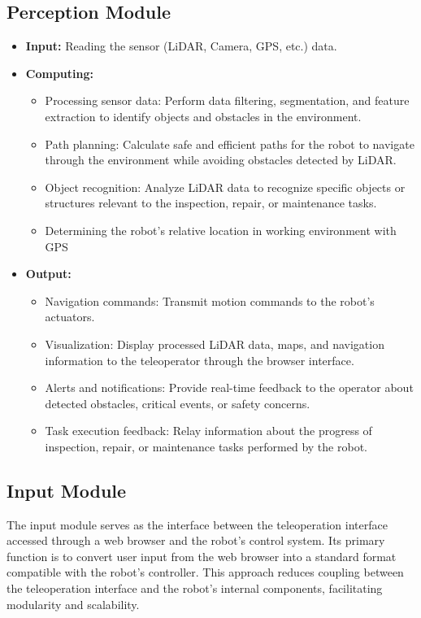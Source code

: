 \documentclass{article}
\begin{document}
\subsection{Perception Module}
\begin{itemize}
    \item \textbf{Input:} Reading the sensor (LiDAR, Camera, GPS, etc.) data.
    \item \textbf{Computing:}
    \begin{itemize}
        \item Processing sensor data: Perform data filtering, segmentation, and feature extraction to identify objects and obstacles in the environment.
        \item Path planning: Calculate safe and efficient paths for the robot to navigate through the environment while avoiding obstacles detected by LiDAR.
        \item Object recognition: Analyze LiDAR data to recognize specific objects or structures relevant to the inspection, repair, or maintenance tasks.
        \item Determining the robot's relative location in working environment with GPS
    \end{itemize}
    \item \textbf{Output:}
    \begin{itemize}
        \item Navigation commands: Transmit motion commands to the robot's actuators.
        \item Visualization: Display processed LiDAR data, maps, and navigation information to the teleoperator through the browser interface.
        \item Alerts and notifications: Provide real-time feedback to the operator about detected obstacles, critical events, or safety concerns.
        \item Task execution feedback: Relay information about the progress of inspection, repair, or maintenance tasks performed by the robot.
    \end{itemize}
\end{itemize}

\subsection{Input Module}
The input module serves as the interface between the teleoperation interface accessed through a web browser and the robot's control system. Its primary function is to convert user input from the web browser into a standard format compatible with the robot's controller. This approach reduces coupling between the teleoperation interface and the robot's internal components, facilitating modularity and scalability.
\end{document}
